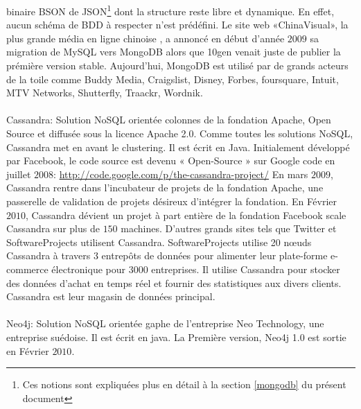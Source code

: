binaire \textsf{BSON} de \textsf{JSON}\footnote{Ces notions sont
expliquées plus en détail à la section \ref{mongodb} du présent
document} dont la structure reste libre et dynamique.  En effet, aucun
schéma de \textsf{BDD} à respecter n'est prédéfini\cite{mongoDB}. Le
site web «\textsf{ChinaVisual}», la plus grande média en ligne
chinoise
,
a annoncé en début d'année $2009$ sa migration de \textsf{MySQL}
vers \textsf{MongoDB}\cite{GUYunhua} alors que \textsf{10gen} venait juste de publier la prémière version stable. Aujourd'hui, \textsf{MongoDB} est utilisé par de grands acteurs de la toile comme \textsf{Buddy Media, Craigslist, Disney, Forbes, foursquare, Intuit, MTV Networks, Shutterfly, Traackr, Wordnik}\cite{10genClients}.
\\
\\ 
\textsf{Cassandra}:  Solution \textsf{NoSQL} orientée 
\textsf{colonnes} de la fondation \textsf{Apache}, Open Source et diffusée sous la licence
 Apache 2.0. Comme toutes les solutions \textsf{NoSQL}, \textsf{Cassandra} 
met en avant le clustering. Il est écrit en 
\textsf{Java}\cite{RickCattell}. Initialement développé par 
\textsf{Facebook}, le code source est devenu « \textsf{Open-Source} » sur 
\textsf{Google code} en juillet $2008$: 
\url{http://code.google.com/p/the-cassandra-project/}
En
mars $2009$, \textsf{Cassandra} rentre dans l'incubateur de projets
de la fondation \textsf{Apache}, une passerelle de
validation de projets désireux d'intégrer la fondation. En Février
$2010$, \textsf{Cassandra} dévient un projet à part entière de la
fondation
\textsf{Facebook}
scale \textsf{Cassandra} sur plus de $150$ machines. D'autres grands
sites tels que \textsf{Twitter et SoftwareProjects}
utilisent \textsf{Cassandra}. \textsf{SoftwareProjects} utilise 20
nœuds \textsf{Cassandra} à travers 3 entrepôts de données pour
alimenter leur plate-forme e-commerce électronique pour $3000$
entreprises. Il utilise \textsf{Cassandra} pour stocker des données
d'achat en temps réel et fournir des statistiques aux divers
clients. \textsf{Cassandra} est leur magasin de données
principal\cite{apacheClients}.
\\
\\
\textsf{Neo4j}:  Solution \textsf{NoSQL} orientée 
\textsf{gaphe} de l'entreprise \textsf{Neo Technology}, une entreprise suédoise\cite{MichaelFiguiereNeo4j}. Il est écrit en java\cite{GavinTerrill}. La Première version, \textsf{Neo4j 1.0} est sortie en Février $2010$\cite{Neo4jBlog}. 
